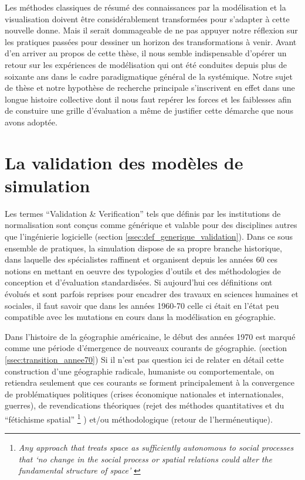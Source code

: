 Les méthodes classiques de résumé des connaissances par la modélisation et la visualisation doivent être considérablement transformées pour s’adapter à cette nouvelle donne. Mais il serait dommageable de ne pas appuyer notre réflexion sur les pratiques passées pour dessiner un horizon des transformations à venir. Avant d’en arriver au propos de cette thèse, il nous semble indispensable d’opérer un retour sur les expériences de modélisation qui ont été conduites depuis plus de soixante ans dans le cadre paradigmatique général de la systémique. Notre sujet de thèse et notre hypothèse de recherche principale s’inscrivent en effet dans une longue histoire collective dont il nous faut repérer les forces et les faiblesses afin de constuire une grille d'évaluation a même de justifier cette démarche que nous avons adoptée.



\section{La validation des modèles de simulation}
\label{sec:constante_problematique}

Les termes \enquote{Validation \& Verification} tels que définis par les institutions de normalisation sont conçus comme générique et valable pour des disciplines autres que l'ingénierie logicielle (section \ref{ssec:def_generique_validation}). Dans ce sous ensemble de pratiques, la simulation dispose de sa propre branche historique, dans laquelle des spécialistes raffinent et organisent depuis les années 60 ces notions en mettant en oeuvre des typologies d'outils et des méthodologies de conception et d'évaluation standardisées. \autocite{Nance2002} Si aujourd'hui ces définitions ont évolués et sont parfois reprises pour encadrer des travaux en sciences humaines et sociales, il faut savoir que dans les années 1960-70 celle ci était en l'état peu compatible avec les mutations en cours dans la modélisation en géographie. 

Dans l'histoire de la géographie américaine, le début des années 1970 est marqué comme une période d'émergence de nouveaux courants de géographie. (section \ref{ssec:transition_annee70}) Si il n'est pas question ici de relater en détail cette construction d'une géographie radicale, humaniste ou comportementale, on retiendra seulement que ces courants se forment principalement à la convergence de problématiques politiques (crises économique nationales et internationales, guerres), de revendications théoriques (rejet des méthodes quantitatives et du \enquote{fétichisme spatial} \footnote{\textit{Any approach that treats space as sufficiently autonomous to social processes that ‘no change in the social process or spatial relations could alter the fundamental structure of space’} \autocite[712]{Gregory2009}} ) et/ou méthodologique (retour de l’herméneutique). 

